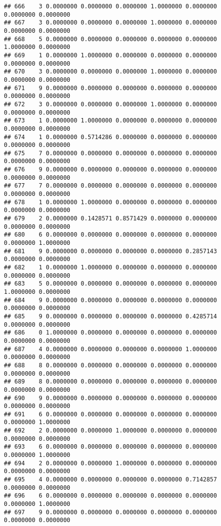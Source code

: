 \documentclass[
]{article}
\begin{document}
\begin{verbatim}
## 666    3 0.0000000 0.0000000 0.0000000 1.0000000 0.0000000 0.0000000 0.0000000
## 667    3 0.0000000 0.0000000 0.0000000 1.0000000 0.0000000 0.0000000 0.0000000
## 668    5 0.0000000 0.0000000 0.0000000 0.0000000 0.0000000 1.0000000 0.0000000
## 669    1 0.0000000 1.0000000 0.0000000 0.0000000 0.0000000 0.0000000 0.0000000
## 670    3 0.0000000 0.0000000 0.0000000 1.0000000 0.0000000 0.0000000 0.0000000
## 671    9 0.0000000 0.0000000 0.0000000 0.0000000 0.0000000 0.0000000 0.0000000
## 672    3 0.0000000 0.0000000 0.0000000 1.0000000 0.0000000 0.0000000 0.0000000
## 673    1 0.0000000 1.0000000 0.0000000 0.0000000 0.0000000 0.0000000 0.0000000
## 674    1 0.0000000 0.5714286 0.0000000 0.0000000 0.0000000 0.0000000 0.0000000
## 675    7 0.0000000 0.0000000 0.0000000 0.0000000 0.0000000 0.0000000 0.0000000
## 676    9 0.0000000 0.0000000 0.0000000 0.0000000 0.0000000 0.0000000 0.0000000
## 677    7 0.0000000 0.0000000 0.0000000 0.0000000 0.0000000 0.0000000 0.0000000
## 678    1 0.0000000 1.0000000 0.0000000 0.0000000 0.0000000 0.0000000 0.0000000
## 679    2 0.0000000 0.1428571 0.8571429 0.0000000 0.0000000 0.0000000 0.0000000
## 680    6 0.0000000 0.0000000 0.0000000 0.0000000 0.0000000 0.0000000 1.0000000
## 681    9 0.0000000 0.0000000 0.0000000 0.0000000 0.2857143 0.0000000 0.0000000
## 682    1 0.0000000 1.0000000 0.0000000 0.0000000 0.0000000 0.0000000 0.0000000
## 683    5 0.0000000 0.0000000 0.0000000 0.0000000 0.0000000 1.0000000 0.0000000
## 684    9 0.0000000 0.0000000 0.0000000 0.0000000 0.0000000 0.0000000 0.0000000
## 685    9 0.0000000 0.0000000 0.0000000 0.0000000 0.4285714 0.0000000 0.0000000
## 686    0 1.0000000 0.0000000 0.0000000 0.0000000 0.0000000 0.0000000 0.0000000
## 687    4 0.0000000 0.0000000 0.0000000 0.0000000 1.0000000 0.0000000 0.0000000
## 688    8 0.0000000 0.0000000 0.0000000 0.0000000 0.0000000 0.0000000 0.0000000
## 689    8 0.0000000 0.0000000 0.0000000 0.0000000 0.0000000 0.0000000 0.0000000
## 690    9 0.0000000 0.0000000 0.0000000 0.0000000 0.0000000 0.0000000 0.0000000
## 691    6 0.0000000 0.0000000 0.0000000 0.0000000 0.0000000 0.0000000 1.0000000
## 692    2 0.0000000 0.0000000 1.0000000 0.0000000 0.0000000 0.0000000 0.0000000
## 693    6 0.0000000 0.0000000 0.0000000 0.0000000 0.0000000 0.0000000 1.0000000
## 694    2 0.0000000 0.0000000 1.0000000 0.0000000 0.0000000 0.0000000 0.0000000
## 695    4 0.0000000 0.0000000 0.0000000 0.0000000 0.7142857 0.0000000 0.0000000
## 696    6 0.0000000 0.0000000 0.0000000 0.0000000 0.0000000 0.0000000 1.0000000
## 697    9 0.0000000 0.0000000 0.0000000 0.0000000 0.0000000 0.0000000 0.0000000

\end{verbatim}
\end{document}
